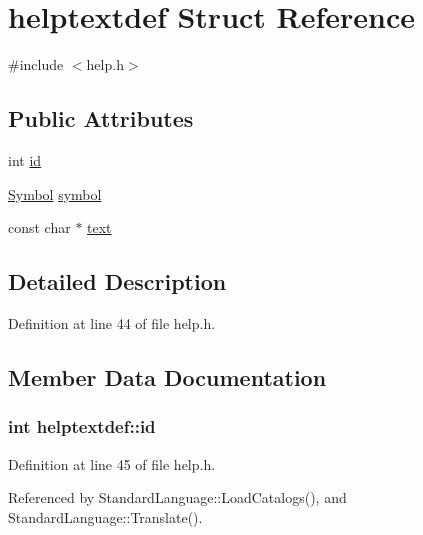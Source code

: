 \hypertarget{structhelptextdef}{}\section{helptextdef Struct Reference}
\label{structhelptextdef}


{\ttfamily \#include $<$help.\+h$>$}

\subsection*{Public Attributes}
\begin{DoxyCompactItemize}
\item 
int \hyperlink{structhelptextdef_a1966e6b243fd4f0c76c550399caeb2b7}{id}
\item 
\hyperlink{lex_8h_a7feef761cd73fac6e25b8bb80d2c4e54}{Symbol} \hyperlink{structhelptextdef_ab81d2160beaa0a3ffd69a4ec3eaa14ba}{symbol}
\item 
const char $\ast$ \hyperlink{structhelptextdef_af80f06e37a0841530529a97d359afba0}{text}
\end{DoxyCompactItemize}


\subsection{Detailed Description}


Definition at line 44 of file help.\+h.



\subsection{Member Data Documentation}
\subsubsection[{\texorpdfstring{id}{id}}]{\setlength{\rightskip}{0pt plus 5cm}int helptextdef\+::id}\hypertarget{structhelptextdef_a1966e6b243fd4f0c76c550399caeb2b7}{}\label{structhelptextdef_a1966e6b243fd4f0c76c550399caeb2b7}


Definition at line 45 of file help.\+h.



Referenced by Standard\+Language\+::\+Load\+Catalogs(), and Standard\+Language\+::\+Translate().

